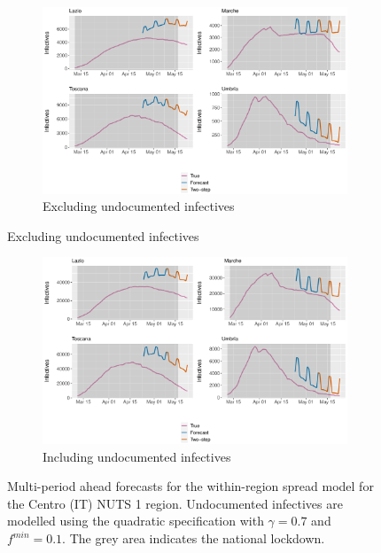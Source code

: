 \documentclass[12pt]{article}
\begin{document}
\begin{appendices}
        \begin{figure}[H]
    	    \centering
    	    \begin{subfigure}{\textwidth}
    	      \centering
    	      \includegraphics[width=0.91\linewidth]{output/model_within_lag14_forecast_full_Centro (IT).pdf}
    	      \caption{Excluding undocumented infectives}
    	      \label{fig:forecast_full_within_centro_regular}
    	    \end{subfigure}
        \end{figure}
        \begin{figure}[H]\ContinuedFloat
    	    \begin{subfigure}{\textwidth}
    	      \centering
    	      \includegraphics[width=0.91\linewidth]{output/model_within_lag14_forecast_full_Centro (IT)_UndocQuadratic.pdf}
    	      \caption{Including undocumented infectives}
    	      \label{fig:forecast_full_within_centro_undoc}
    	    \end{subfigure}
    	    \caption{Multi-period ahead forecasts for the within-region spread model for the Centro (IT) NUTS 1 region. Undocumented infectives are modelled using the quadratic specification with $\gamma = 0.7$ and $f^{min}=0.1$. The grey area indicates the national lockdown.}
    	    \label{fig:forecast_full_within_centro}
        \end{figure}
        

\end{appendices}
\end{document}
